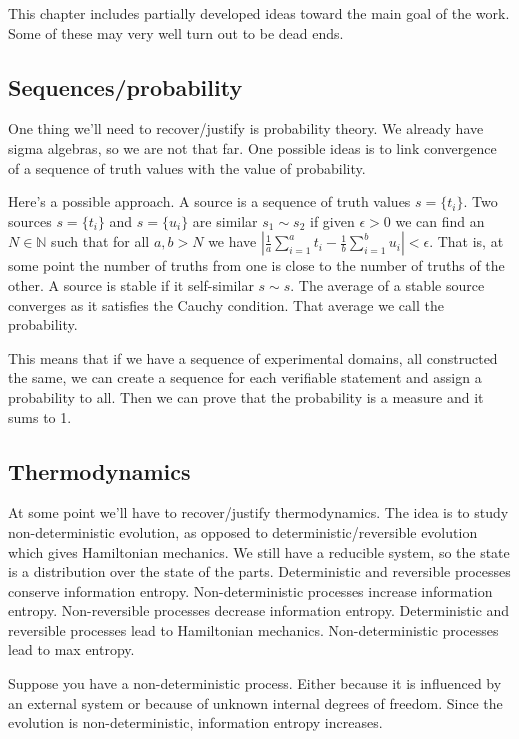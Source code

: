 \documentclass[11pt,letterpaper,fleqn]{memoir} %
\begin{document}
This chapter includes partially developed ideas toward the main goal of the work. Some of these may very well turn out to be dead ends.

\subsection{Sequences/probability}

One thing we'll need to recover/justify is probability theory. We already have sigma algebras, so we are not that far. One possible ideas is to link convergence of a sequence of truth values with the value of probability.

Here's a possible approach. A source is a sequence of truth values $s=\{t_i\}$. Two sources $s=\{t_i\}$ and $s=\{u_i\}$ are similar $s_1 \sim s_2$ if given $\epsilon > 0$ we can find an $N \in \mathbb{N}$ such that for all $a,b>N$ we have $\left| \frac{1}{a} \sum\limits_{i=1}^a t_i - \frac{1}{b} \sum\limits_{i=1}^b u_i \right| < \epsilon$. That is, at some point the number of truths from one is close to the number of truths of the other. A source is stable if it self-similar $s \sim s$. The average of a stable source converges as it satisfies the Cauchy condition. That average we call the probability.

This means that if we have a sequence of experimental domains, all constructed the same, we can create a sequence for each verifiable statement and assign a probability to all. Then we can prove that the probability is a measure and it sums to 1.

\subsection{Thermodynamics}

At some point we'll have to recover/justify thermodynamics. The idea is to study non-deterministic evolution, as opposed to deterministic/reversible evolution which gives Hamiltonian mechanics. We still have a reducible system, so the state is a distribution over the state of the parts. Deterministic and reversible processes conserve information entropy. Non-deterministic processes increase information entropy. Non-reversible processes decrease information entropy. Deterministic and reversible processes lead to Hamiltonian mechanics. Non-deterministic processes lead to max entropy.

Suppose you have a non-deterministic process. Either because it is influenced by an external system or because of unknown internal degrees of freedom. Since the evolution is non-deterministic, information entropy increases.
\end{document}
